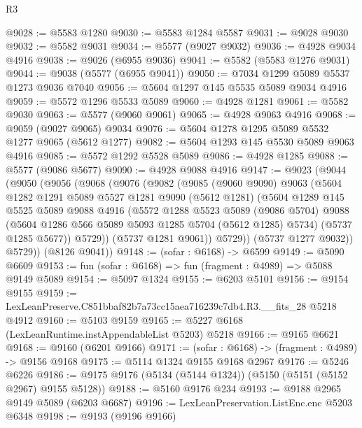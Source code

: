 \begin{lexlean}{R3}
\begin{coremodule}
@9028 := @5583 @1280
@9030 := @5583 @1284 @5587
@9031 := @9028 @9030
@9032 := @5582 @9031
@9034 := @5577 (@9027 @9032)
@9036 := @4928 @9034 @4916
@9038 := @9026 (@6955 @9036)
@9041 := @5582 (@5583 @1276 @9031)
@9044 := @9038 (@5577 (@6955 @9041))
@9050 := @7034 @1299 @5089 @5537 @1273 @9036 @7040
@9056 := @5604 @1297 @145 @5535 @5089 @9034 @4916
@9059 := @5572 @1296 @5533 @5089
@9060 := @4928 @1281
@9061 := @5582 @9030
@9063 := @5577 (@9060 @9061)
@9065 := @4928 @9063 @4916
@9068 := @9059 (@9027 @9065) @9034
@9076 := @5604 @1278 @1295 @5089 @5532 @1277 @9065 (@5612 @1277)
@9082 := @5604 @1293 @145 @5530 @5089 @9063 @4916
@9085 := @5572 @1292 @5528 @5089
@9086 := @4928 @1285
@9088 := @5577 (@9086 @5677)
@9090 := @4928 @9088 @4916
@9147 := @9023
    (@9044
      (@9050
        (@9056
          (@9068
            (@9076
              (@9082
                (@9085
                  (@9060 @9090)
                  @9063
                  (@5604
                    @1282
                    @1291
                    @5089
                    @5527
                    @1281
                    @9090
                    (@5612 @1281)
                    (@5604
                      @1289
                      @145
                      @5525
                      @5089
                      @9088
                      @4916
                      (@5572
                        @1288
                        @5523
                        @5089
                        (@9086 @5704)
                        @9088
                        (@5604 @1286 @566 @5089 @5093 @1285 @5704 (@5612 @1285) @5734)
                        (@5737 @1285 @5677))
                      @5729))
                  (@5737 @1281 @9061))
                @5729))
            (@5737 @1277 @9032))
          @5729))
      (@8126 @9041))
@9148 := (sofar : @6168) -> @6599
@9149 := @5090 @6609
@9153 := fun (sofar : @6168) => fun (fragment : @4989) => @5088 @9149 @5089
@9154 := @5097 @1324
@9155 := @6203 @5101
@9156 := @9154 @9155
@9159 := LexLeanPreserve.C851bbaf82b7a73cc15aea716239c7db4.R3.__fits_28 @5218 @4912
@9160 := @5103 @9159
@9165 := @5227 @6168 (LexLeanRuntime.instAppendableList @5203) @5218
@9166 := @9165 @6621
@9168 := @9160 (@6201 @9166)
@9171 := (sofar : @6168) -> (fragment : @4989) -> @9156 @9168
@9175 := @5114 @1324 @9155 @9168 @2967
@9176 := @5246 @6226
@9186 := @9175 @9176 (@5134 (@5144 @1324)) (@5150 (@5151 (@5152 @2967) @9155 @5128))
@9188 := @5160 @9176 @234
@9193 := @9188 @2965 @9149 @5089 (@6203 @6687)
@9196 := LexLeanPreservation.ListEnc.enc @5203 @6348
@9198 := @9193 (@9196 @9166)

\end{coremodule}
\end{lexlean}
